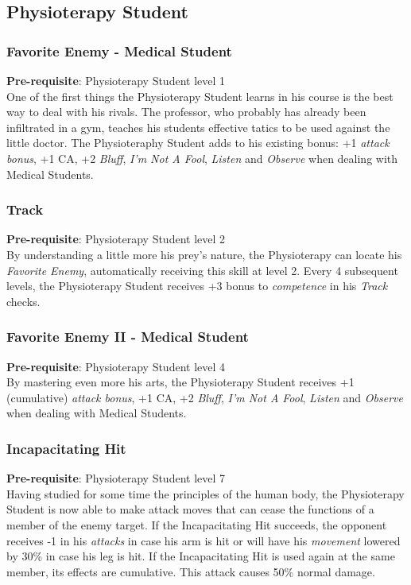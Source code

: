 \documentclass[ letterpaper,12pt]{article}
\begin{document}
\subsection{Physioterapy Student}

\subsubsection{Favorite Enemy - Medical Student}
 {\bf Pre-requisite}: Physioterapy Student level 1\\
 One of the first things the Physioterapy Student learns in his course is the best way to deal with his rivals. The professor, who probably has already been infiltrated in a gym, teaches his students effective tatics to be used against the little doctor. The Physioteraphy Student adds to his existing bonus: +1 {\it attack bonus}, +1 CA, +2 {\it Bluff}, {\it I'm Not A Fool}, {\it Listen} and {\it Observe} when dealing with Medical Students.

\subsubsection{Track}
 {\bf Pre-requisite}: Physioterapy Student level 2\\
 By understanding a little more his prey's nature, the Physioterapy can locate his {\it Favorite Enemy}, automatically receiving this skill at level 2. Every 4 subsequent levels, the Physioterapy Student receives +3 bonus to {\it competence} in his {\it Track} checks.

\subsubsection{Favorite Enemy II - Medical Student}
 {\bf Pre-requisite}: Physioterapy Student level 4\\
 By mastering even more his arts, the Physioterapy Student receives +1 (cumulative) {\it attack bonus}, +1 CA, +2 {\it Bluff}, {\it I'm Not A Fool}, {\it Listen} and {\it Observe} when dealing with Medical Students.

\subsubsection{Incapacitating Hit}
 {\bf Pre-requisite}: Physioterapy Student level 7\\
 Having studied for some time the principles of the human body, the Physioterapy Student is now able to make attack moves that can cease the functions of a member of the enemy target. If the Incapacitating Hit succeeds, the opponent receives -1 in his {\it attacks}  in case his arm is hit or will have his {\it movement} lowered by 30\% in case his leg is hit. If the Incapacitating Hit is used again at the same member, its effects are cumulative. This attack causes 50\% normal damage.
\end{document}
